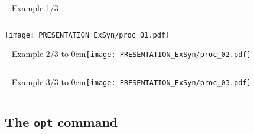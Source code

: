 \begin{frame}[fragile]{\subsecname{} -- Example 1/3}
\begin{columns}
\column[t]{5cm}

\column[t]{5cm}

\end{columns}
\hfil\texttt{[image: PRESENTATION\_ExSyn/proc\_01.pdf]}
\end{frame}

\begin{frame}[t, fragile]{\subsecname{} -- Example 2/3}
\vbox to 0cm{\texttt{[image: PRESENTATION\_ExSyn/proc\_02.pdf]}\vss}
\vskip-1cm
\begin{columns}
\column[t]{5cm}

\column[t]{5cm}

\end{columns}
\end{frame}

\begin{frame}[t, fragile]{\subsecname{} -- Example 3/3}
\vbox to 0cm{\texttt{[image: PRESENTATION\_ExSyn/proc\_03.pdf]}\vss}
\vskip-1cm
\begin{columns}
\column[t]{5cm}

\column[t]{5cm}

\end{columns}
\end{frame}


\subsection{The {\tt opt} command}

